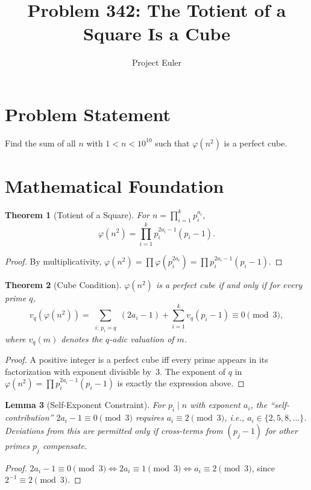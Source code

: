\documentclass[a4paper,12pt]{article}
\title{Problem 342: The Totient of a Square Is a Cube}
\author{Project Euler}
\date{}
\newtheorem{theorem}{Theorem}
\newtheorem{lemma}[theorem]{Lemma}
\begin{document}
\maketitle

\section{Problem Statement}
Find the sum of all $n$ with $1 < n < 10^{10}$ such that $\varphi(n^2)$ is a perfect cube.

\section{Mathematical Foundation}

\begin{theorem}[Totient of a Square]
For $n = \prod_{i=1}^{k} p_i^{a_i}$,
\[
\varphi(n^2) = \prod_{i=1}^{k} p_i^{2a_i - 1}(p_i - 1).
\]
\end{theorem}

\begin{proof}
By multiplicativity, $\varphi(n^2) = \prod \varphi(p_i^{2a_i}) = \prod p_i^{2a_i - 1}(p_i - 1)$.
\end{proof}

\begin{theorem}[Cube Condition]
$\varphi(n^2)$ is a perfect cube if and only if for every prime $q$,
\[
v_q\!\left(\varphi(n^2)\right) = \sum_{\substack{i:\, p_i = q}} (2a_i - 1) + \sum_{i=1}^{k} v_q(p_i - 1) \equiv 0 \pmod{3},
\]
where $v_q(m)$ denotes the $q$-adic valuation of $m$.
\end{theorem}

\begin{proof}
A positive integer is a perfect cube iff every prime appears in its factorization with exponent divisible by~3. The exponent of $q$ in $\varphi(n^2) = \prod p_i^{2a_i-1}(p_i - 1)$ is exactly the expression above.
\end{proof}

\begin{lemma}[Self-Exponent Constraint]
For $p_i \mid n$ with exponent $a_i$, the ``self-contribution'' $2a_i - 1 \equiv 0 \pmod{3}$ requires $a_i \equiv 2 \pmod{3}$, i.e., $a_i \in \{2, 5, 8, \ldots\}$. Deviations from this are permitted only if cross-terms from $(p_j - 1)$ for other primes $p_j$ compensate.
\end{lemma}

\begin{proof}
$2a_i - 1 \equiv 0 \pmod{3} \iff 2a_i \equiv 1 \pmod{3} \iff a_i \equiv 2 \pmod{3}$, since $2^{-1} \equiv 2 \pmod{3}$.
\end{proof}
\end{document}
